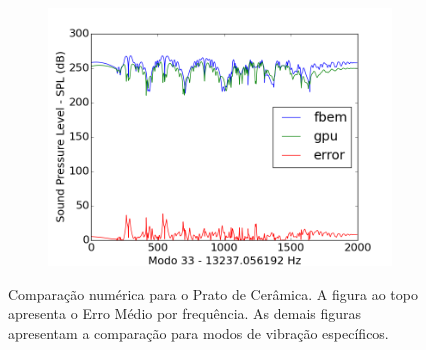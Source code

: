 \begin{figure}[ht]
\begin{subfigure}{0.45\textwidth}
	\includegraphics[width=\textwidth]{../data/transfer_test/ceramic_plate/plots/ceramic_plate-tfv-0_33.png}
	\caption{}
	\label{fig:coef_plate_33}
\end{subfigure}
\caption[Comparação numérica para o Prato de Cerâmica]{Comparação numérica para o Prato de Cerâmica. A figura ao topo apresenta o Erro Médio por frequência. As demais figuras apresentam a comparação para modos de vibração específicos.}
\label{fig:coef_plate}
\end{figure}

